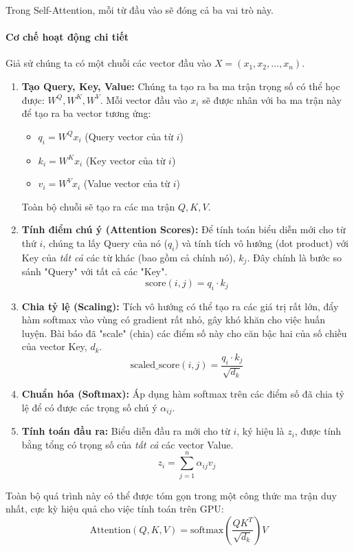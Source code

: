 Trong Self-Attention, mỗi từ đầu vào sẽ đóng cả ba vai trò này.
\paragraph{Cơ chế hoạt động chi tiết}
Giả sử chúng ta có một chuỗi các vector đầu vào $X = (x_1, x_2, \dots, x_n)$.
\begin{enumerate}
    \item \textbf{Tạo Query, Key, Value:} Chúng ta tạo ra ba ma trận trọng số có thể học được: $W^Q, W^K, W^V$. Mỗi vector đầu vào $x_i$ sẽ được nhân với ba ma trận này để tạo ra ba vector tương ứng:
        \begin{itemize}
            \item $q_i = W^Q x_i$ (Query vector của từ $i$)
            \item $k_i = W^K x_i$ (Key vector của từ $i$)
            \item $v_i = W^V x_i$ (Value vector của từ $i$)
        \end{itemize}
        Toàn bộ chuỗi sẽ tạo ra các ma trận $Q, K, V$.
    \item \textbf{Tính điểm chú ý (Attention Scores):} Để tính toán biểu diễn mới cho từ thứ $i$, chúng ta lấy Query của nó ($q_i$) và tính tích vô hướng (dot product) với Key của \textit{tất cả} các từ khác (bao gồm cả chính nó), $k_j$. Đây chính là bước so sánh "Query" với tất cả các "Key".
        $$ \text{score}(i, j) = q_i \cdot k_j $$
    \item \textbf{Chia tỷ lệ (Scaling):} Tích vô hướng có thể tạo ra các giá trị rất lớn, đẩy hàm softmax vào vùng có gradient rất nhỏ, gây khó khăn cho việc huấn luyện. Bài báo đã "scale" (chia) các điểm số này cho căn bậc hai của số chiều của vector Key, $d_k$.
        $$ \text{scaled\_score}(i, j) = \frac{q_i \cdot k_j}{\sqrt{d_k}} $$
    \item \textbf{Chuẩn hóa (Softmax):} Áp dụng hàm softmax trên các điểm số đã chia tỷ lệ để có được các trọng số chú ý $\alpha_{ij}$.
    \item \textbf{Tính toán đầu ra:} Biểu diễn đầu ra mới cho từ $i$, ký hiệu là $z_i$, được tính bằng tổng có trọng số của \textit{tất cả} các vector Value.
        $$ z_i = \sum_{j=1}^{n} \alpha_{ij} v_j $$
\end{enumerate}

Toàn bộ quá trình này có thể được tóm gọn trong một công thức ma trận duy nhất, cực kỳ hiệu quả cho việc tính toán trên GPU:
\begin{equation}
    \text{Attention}(Q, K, V) = \text{softmax}\left(\frac{QK^T}{\sqrt{d_k}}\right)V
    \label{eq:scaled_dot_product_attention}
\end{equation}


